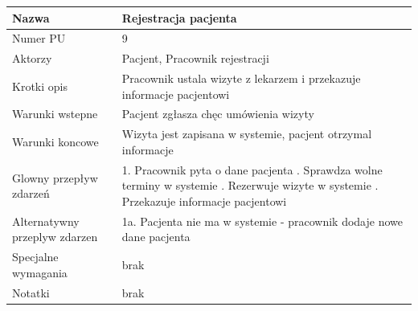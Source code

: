 \documentclass{article}
\begin{document}
\noindent
\begin{tabular}{|m{10em}|m{30em}|}
        \hline
        Nazwa & Rejestracja pacjenta \\
        \hline
        Numer PU & 9\\
        \hline
        Aktorzy & Pacjent, Pracownik rejestracji\\
        \hline
        Krotki opis & Pracownik ustala wizyte z lekarzem i przekazuje informacje pacjentowi\\
        \hline
        Warunki wstepne & Pacjent zgłasza chęc umówienia wizyty\\
        \hline
        Warunki koncowe & Wizyta jest zapisana w systemie, pacjent otrzymal informacje\\
        \hline
        Glowny przepływ zdarzeń & 1. Pracownik pyta o dane pacjenta \newline
                                 2. Sprawdza wolne terminy w systemie \newline
                                 3. Rezerwuje wizyte w systemie \newline
                                 4. Przekazuje informacje pacjentowi  \\
        \hline
        Alternatywny przeplyw zdarzen &  1a. Pacjenta nie ma w systemie - pracownik dodaje nowe dane pacjenta\\
        \hline
        Specjalne wymagania & brak\\
        \hline
        Notatki& brak\\
        \hline
\end{tabular}

\vspace{1cm}
\end{document}

